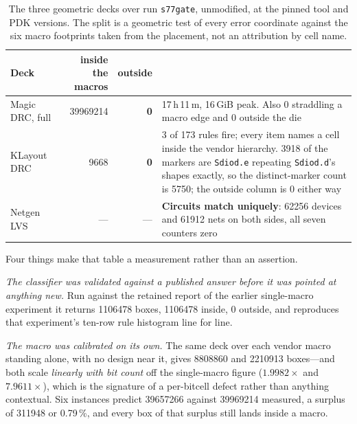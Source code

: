 \documentclass[11pt,a4paper]{article}
\begin{document}
\begin{table}[htbp]
\centering
\caption{The three geometric decks over run \texttt{s77gate}, unmodified,
at the pinned tool and PDK versions. The split is a geometric test of
every error coordinate against the six macro footprints taken from the
placement, not an attribution by cell name.}
\label{tab:decks}
\small
\begin{tabularx}{\textwidth}{L{2.9cm}rrX}
\toprule
Deck & inside the macros & outside & \\
\midrule
Magic DRC, full & \num{39969214} & \textbf{0} & 17\,h\,11\,m, 16\,GiB
peak. Also 0 straddling a macro edge and 0 outside the die \\
KLayout DRC & \num{9668} & \textbf{0} & 3 of 173 rules fire; every item
names a cell inside the vendor hierarchy. \num{3918} of the markers are
\texttt{Sdiod.e} repeating \texttt{Sdiod.d}'s shapes exactly, so the
distinct-marker count is \num{5750}; the outside column is 0 either way \\
Netgen LVS & --- & --- & \textbf{Circuits match uniquely}: \num{62256}
devices and \num{61912} nets on both sides, all seven counters zero \\
\bottomrule
\end{tabularx}
\end{table}

Four things make that table a measurement rather than an assertion.

\emph{The classifier was validated against a published answer before it
was pointed at anything new.} Run against the retained report of the
earlier single-macro experiment it returns \num{1106478} boxes,
\num{1106478} inside, 0 outside, and reproduces that experiment's
ten-row rule histogram line for line.

\emph{The macro was calibrated on its own.} The same deck over each
vendor macro standing alone, with no design near it, gives
\num{8808860} and \num{2210913} boxes---and both scale \emph{linearly
with bit count} off the single-macro figure ($1.9982\times$ and
$7.9611\times$), which is the signature of a per-bitcell defect rather
than anything contextual. Six instances predict \num{39657266} against
\num{39969214} measured, a surplus of \num{311948} or 0.79\,\%, and
every box of that surplus still lands inside a macro.
\end{document}
